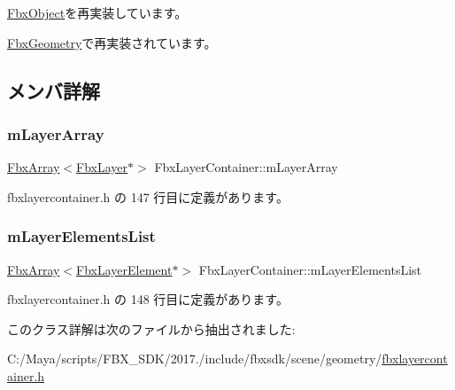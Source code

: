 \hyperlink{class_fbx_object_a5f01a45e03bbf2c243ae9ef71d9050cf}{Fbx\+Object}を再実装しています。



\hyperlink{class_fbx_geometry_a4e28b47a5f6dba7d53e692486d69c126}{Fbx\+Geometry}で再実装されています。



\subsection{メンバ詳解}
\mbox{\label{class_fbx_layer_container_afb0f4b99b62fcfa0203831995dc4e274}} 
\subsubsection{\texorpdfstring{m\+Layer\+Array}{mLayerArray}}
{\footnotesize\ttfamily \hyperlink{class_fbx_array}{Fbx\+Array}$<$\hyperlink{class_fbx_layer}{Fbx\+Layer}$\ast$$>$ Fbx\+Layer\+Container\+::m\+Layer\+Array\hspace{0.3cm}{\ttfamily [protected]}}



 fbxlayercontainer.\+h の 147 行目に定義があります。

\mbox{\label{class_fbx_layer_container_a7f935eeb2435e0b3cfa69bd1b54b5c11}} 
\subsubsection{\texorpdfstring{m\+Layer\+Elements\+List}{mLayerElementsList}}
{\footnotesize\ttfamily \hyperlink{class_fbx_array}{Fbx\+Array}$<$\hyperlink{class_fbx_layer_element}{Fbx\+Layer\+Element}$\ast$$>$ Fbx\+Layer\+Container\+::m\+Layer\+Elements\+List\hspace{0.3cm}{\ttfamily [protected]}}



 fbxlayercontainer.\+h の 148 行目に定義があります。



このクラス詳解は次のファイルから抽出されました\+:\begin{DoxyCompactItemize}
\item 
C\+:/\+Maya/scripts/\+F\+B\+X\+\_\+\+S\+D\+K/2017./include/fbxsdk/scene/geometry/\hyperlink{fbxlayercontainer_8h}{fbxlayercontainer.\+h}\end{DoxyCompactItemize}
